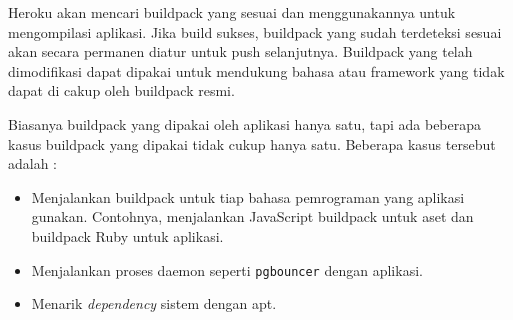 Heroku akan mencari buildpack yang sesuai dan menggunakannya untuk mengompilasi aplikasi. Jika build sukses, buildpack yang sudah terdeteksi sesuai akan secara permanen diatur untuk push selanjutnya. Buildpack yang telah dimodifikasi dapat dipakai untuk mendukung bahasa atau framework yang tidak dapat di cakup oleh buildpack resmi.

Biasanya buildpack yang dipakai oleh aplikasi hanya satu, tapi ada beberapa kasus buildpack yang dipakai tidak cukup hanya satu. Beberapa kasus tersebut adalah :
\begin{itemize}
\item Menjalankan buildpack untuk tiap bahasa pemrograman yang aplikasi gunakan. Contohnya, menjalankan JavaScript buildpack untuk aset dan buildpack Ruby untuk aplikasi.
\item Menjalankan proses daemon seperti \texttt{pgbouncer} dengan aplikasi.
\item Menarik \textit{dependency} sistem dengan apt.
\end{itemize}

